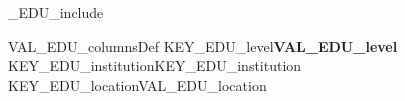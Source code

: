 %
\ifVAL_EDU_include %
\begin{myTableEnv}{VAL_EDU_columnsDef}%
    \myRow%
        {KEY_EDU_level}{\bfseries VAL_EDU_level} %
        {KEY_EDU_institution}{KEY_EDU_institution} %
    \myRow%
        {}{}%
        {KEY_EDU_location}{VAL_EDU_location}%
\end{myTableEnv}%
%
\fi%
%